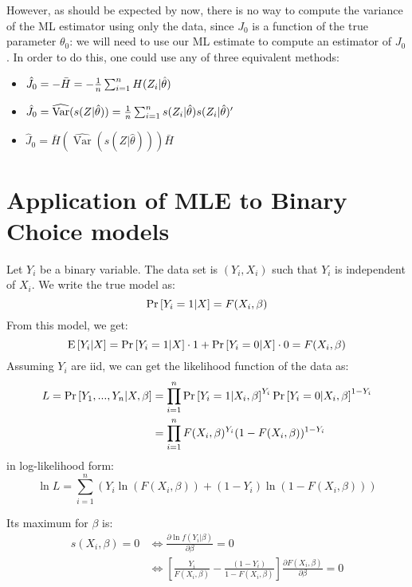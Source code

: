 However, as should be expected by now, there is no way to compute the variance of the ML estimator using only the data, since $J_0$ is a function of the true parameter $\theta_0$: we will need to use our ML estimate to compute an estimator of $J_0$. In order to do this, one could use any of three equivalent methods:
\begin{itemize}
\item $\hat J_0 = - \bar H = - \frac{1}{n} \sum_{i=1}^{n} H(Z_i|\hat\theta)$
\item $\hat J_0 = \widehat{\operatorname{Var}}(s(Z|\hat\theta)) = \frac{1}{n} \sum_{i=1}^{n} s(Z_i|\hat\theta)s(Z_i|\hat\theta)'$
\item $\hat J_0 = \bar H \left(\widehat{\operatorname{Var}}(s(Z|\hat\theta))\right) \bar H $
\end{itemize}

\section{Application of MLE to Binary Choice models}

Let $Y_i$ be a binary variable. The data set is $(Y_i, X_i)$ such that $Y_i$ is independent of $X_i$. We write the true model as: $$\operatorname{Pr}\left[Y_i = 1\vert X\right] = F(X_i, \beta) $$ From this model, we get: $$\operatorname{E}\left[Y_i\vert X\right] = \operatorname{Pr}\left[Y_i = 1\vert X\right]\cdot 1 + \operatorname{Pr}\left[Y_i = 0\vert X\right] \cdot 0 = F(X_i, \beta)$$ Assuming $Y_i$ are iid, we can get the likelihood function of the data as: \begin{align*}
L = \operatorname{Pr}\left[Y_1, ..., Y_n\vert X, \beta\right] & = \prod_{i=1}^{n} \operatorname{Pr}\left[Y_i =1\vert X_i, \beta\right]^{Y_i}\operatorname{Pr}\left[Y_i=0\vert X_i, \beta\right]^{1-Y_i} \\
& = \prod_{i=1}^{n} F(X_i,\beta)^{Y_i} (1 - F(X_i,\beta))^{1 - Y_i}
\end{align*} in log-likelihood form: $$\ln L = \sum_{i=1}^{n} \left(Y_i\ln(F(X_i,\beta)) + (1-Y_i)\ln(1 - F(X_i,\beta))\right) $$ 

Its maximum for $\beta$ is: \begin{align*}
s(X_i,\beta) = 0 & \Leftrightarrow \frac{\partial \ln f(Y_i\vert\beta)}{\partial \beta} = 0 \\
&  \Leftrightarrow \left[\frac{Y_i}{F(X_i,\beta)} - \frac{(1 - Y_i)}{1 - F(X_i,\beta)}\right]\frac{\partial F(X_i,\beta)}{\partial\beta} = 0
\end{align*}

